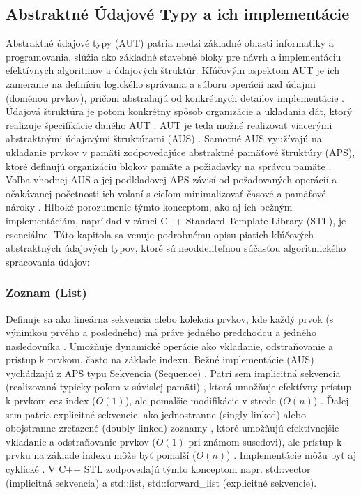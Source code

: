 \documentclass[11pt]{article}
\begin{document}
\subsection{Abstraktné Údajové Typy a ich implementácie}

Abstraktné údajové typy (AUT) patria medzi základné oblasti informatiky a programovania, slúžia ako základné stavebné bloky pre návrh a implementáciu efektívnych algoritmov a údajových štruktúr. Kľúčovým aspektom AUT je ich zameranie na definíciu logického správania a súboru operácií nad údajmi (doménou prvkov), pričom abstrahujú od konkrétnych detailov implementácie \cite{aus3}. Údajová štruktúra je potom konkrétny spôsob organizácie a ukladania dát, ktorý realizuje špecifikácie daného AUT \cite{aus3}. AUT je teda možné realizovať viacerými abstraktnými údajovými štruktúrami (AUS) \cite{aus3}. Samotné AUS využívajú na ukladanie prvkov v pamäti zodpovedajúce abstraktné pamäťové štruktúry (APS), ktoré definujú organizáciu blokov pamäte a požiadavky na správcu pamäte \cite{aus2}. Voľba vhodnej AUS a jej podkladovej APS závisí od požadovaných operácií a očakávanej početnosti ich volaní s cieľom minimalizovať časové a pamäťové nároky \cite{aus2}. Hlboké porozumenie týmto konceptom, ako aj ich bežným implementáciám, napríklad v rámci C++ Standard Template Library (STL), je esenciálne. Táto kapitola sa venuje podrobnému opisu piatich kľúčových abstraktných údajových typov, ktoré sú neoddeliteľnou súčasťou algoritmického spracovania údajov:

\subsubsection{Zoznam (List)}

Definuje sa ako lineárna sekvencia alebo kolekcia prvkov, kde každý prvok (s výnimkou prvého a posledného) má práve jedného predchodcu a jedného nasledovníka \cite{aus2}. Umožňuje dynamické operácie ako vkladanie, odstraňovanie a prístup k prvkom, často na základe indexu. Bežné implementácie (AUS) vychádzajú z APS typu Sekvencia (Sequence) \cite{aus2}. Patrí sem implicitná sekvencia (realizovaná typicky poľom v súvislej pamäti) \cite{aus2}, ktorá umožňuje efektívny prístup k prvkom cez index ($O(1)$), ale pomalšie modifikácie v strede ($O(n)$) \cite{aus2}. Ďalej sem patria explicitné sekvencie, ako jednostranne (singly linked) alebo obojstranne zreťazené (doubly linked) zoznamy \cite{aus2}, ktoré umožňujú efektívnejšie vkladanie a odstraňovanie prvkov ($O(1)$ pri známom susedovi), ale prístup k prvku na základe indexu môže byť pomalší ($O(n)$) \cite{aus2}. Implementácie môžu byť aj cyklické \cite{aus2}. V C++ STL zodpovedajú týmto konceptom napr. std::vector (implicitná sekvencia) a std::list, std::forward\_list (explicitné sekvencie).
\end{document}
